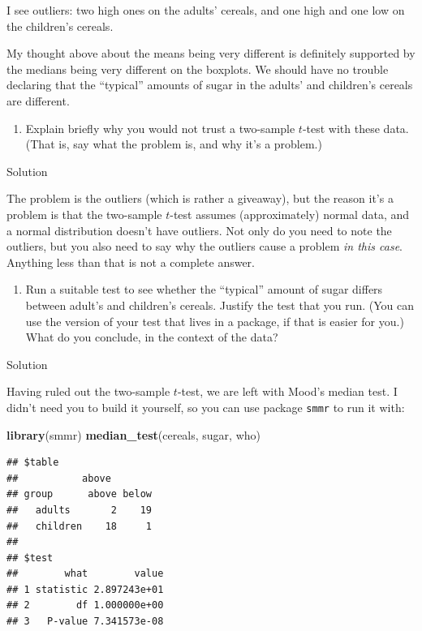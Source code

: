 \documentclass[]{tufte-book}
\newenvironment{Shaded}{}{}
\newcommand{\KeywordTok}[1]{\textcolor[rgb]{0.00,0.44,0.13}{\textbf{#1}}}
\newcommand{\NormalTok}[1]{#1}
\providecommand{\tightlist}{%
  \setlength{\itemsep}{0pt}\setlength{\parskip}{0pt}}
\theoremstyle{definition}
\theoremstyle{definition}
\theoremstyle{definition}
\theoremstyle{remark}
\begin{document}
I see outliers: two high ones on the adults' cereals, and one high and
one low on the children's cereals.

My thought above about the means being very different is definitely
supported by the medians being very different on the boxplots. We should
have no trouble declaring that the ``typical'' amounts of sugar in the
adults' and children's cereals are different.

\begin{enumerate}
\def\labelenumi{(\alph{enumi})}
\setcounter{enumi}{3}
\tightlist
\item
  Explain briefly why you would not trust a two-sample \(t\)-test with
  these data. (That is, say what the problem is, and why it's a
  problem.)
\end{enumerate}

Solution

The problem is the outliers (which is rather a giveaway), but the reason
it's a problem is that the two-sample \(t\)-test assumes (approximately)
normal data, and a normal distribution doesn't have outliers. Not only
do you need to note the outliers, but you also need to say why the
outliers cause a problem \emph{in this case}. Anything less than that is
not a complete answer.

\begin{enumerate}
\def\labelenumi{(\alph{enumi})}
\setcounter{enumi}{4}
\tightlist
\item
  Run a suitable test to see whether the ``typical'' amount of sugar
  differs between adult's and children's cereals. Justify the test that
  you run. (You can use the version of your test that lives in a
  package, if that is easier for you.) What do you conclude, in the
  context of the data?
\end{enumerate}

Solution

Having ruled out the two-sample \(t\)-test, we are left with Mood's
median test. I didn't need you to build it yourself, so you can use
package \texttt{smmr} to run it with:

\begin{Shaded}
\begin{Highlighting}[]
\KeywordTok{library}\NormalTok{(smmr)}
\KeywordTok{median_test}\NormalTok{(cereals, sugar, who)}
\end{Highlighting}
\end{Shaded}

\begin{verbatim}
## $table
##           above
## group      above below
##   adults       2    19
##   children    18     1
## 
## $test
##        what        value
## 1 statistic 2.897243e+01
## 2        df 1.000000e+00
## 3   P-value 7.341573e-08
\end{verbatim}
\end{document}
